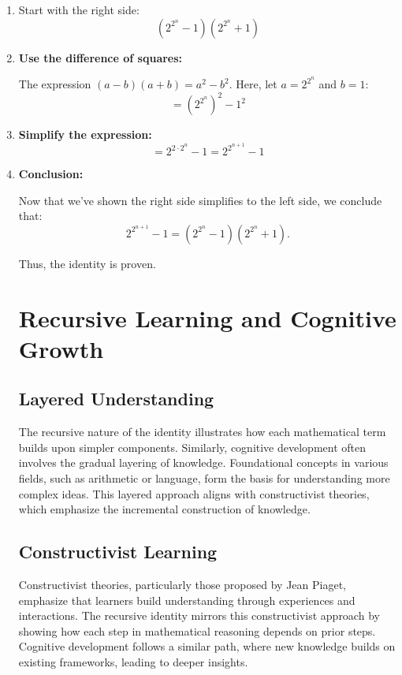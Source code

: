 \documentclass{article}
\begin{document}
\begin{enumerate}
    \item Start with the right side:
    \[
    (2^{2^n} - 1)(2^{2^n} + 1)
    \]

    \item \textbf{Use the difference of squares:}

    The expression \((a - b)(a + b) = a^2 - b^2\). Here, let \( a = 2^{2^n} \) and \( b = 1 \):
    \[
    = (2^{2^n})^2 - 1^2
    \]

    \item \textbf{Simplify the expression:}
    \[
    = 2^{2 \cdot 2^n} - 1 = 2^{2^{n+1}} - 1
    \]

    \item \textbf{Conclusion:}

    Now that we've shown the right side simplifies to the left side, we conclude that:
    \[
    2^{2^{n+1}} - 1 = (2^{2^n} - 1)(2^{2^n} + 1).
    \]

Thus, the identity is proven.

\section{Recursive Learning and Cognitive Growth}

\subsection{Layered Understanding}
The recursive nature of the identity illustrates how each mathematical term builds upon simpler components. Similarly, cognitive development often involves the gradual layering of knowledge. Foundational concepts in various fields, such as arithmetic or language, form the basis for understanding more complex ideas. This layered approach aligns with constructivist theories, which emphasize the incremental construction of knowledge.

\subsection{Constructivist Learning}
Constructivist theories, particularly those proposed by Jean Piaget, emphasize that learners build understanding through experiences and interactions. The recursive identity mirrors this constructivist approach by showing how each step in mathematical reasoning depends on prior steps. Cognitive development follows a similar path, where new knowledge builds on existing frameworks, leading to deeper insights.


\end{enumerate}
\end{document}
